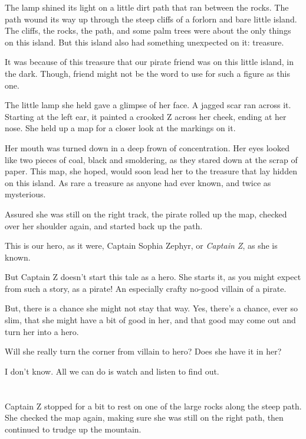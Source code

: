 \documentclass[12pt]{extbook}
\begin{document}
  The lamp shined its light on a little dirt path that ran between the
  rocks. The path wound its way up through the steep cliffs of a forlorn
  and bare little island. The cliffs, the rocks, the path, and some palm
  trees were about the only things on this island. But this island also
  had something unexpected on it: treasure.
  
  It was because of this treasure that our pirate friend was on this
  little island, in the dark. Though, friend might not be the word to use
  for such a figure as this one.
  
  The little lamp she held gave a glimpse of her face. A jagged scar ran
  across it. Starting at the left ear, it painted a crooked Z across her
  cheek, ending at her nose. She held up a map for a closer look at the
  markings on it.
  
  Her mouth was turned down in a deep frown of concentration. Her eyes
  looked like two pieces of coal, black and smoldering, as they stared
  down at the scrap of paper. This map, she hoped, would soon lead her to
  the treasure that lay hidden on this island. As rare a treasure as
  anyone had ever known, and twice as mysterious.
  
  Assured she was still on the right track, the pirate rolled up the map,
  checked over her shoulder again, and started back up the path.
  
  This is our hero, as it were, Captain Sophia Zephyr, or \emph{Captain
  Z}, as she is known.
  
  But Captain Z doesn't start this tale as a hero. She starts it, as you
  might expect from such a story, as a pirate! An especially crafty
  no-good villain of a pirate.
  
  But, there is a chance she might not stay that way. Yes, there's a
  chance, ever so slim, that she might have a bit of good in her, and that
  good may come out and turn her into a hero.
  
  Will she really turn the corner from villain to hero? Does she have it
  in her?
  
  I don't know. All we can do is watch and listen to find out.
  
  \section{}\label{section-1}
  
  Captain Z stopped for a bit to rest on one of the large rocks along the
  steep path. She checked the map again, making sure she was still on the
  right path, then continued to trudge up the mountain.
  
\end{document}
